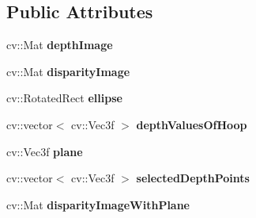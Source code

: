 \subsection*{Public Attributes}
\begin{DoxyCompactItemize}
\item 
\hypertarget{classHoopPosition_a0e936b9d6c792b73dbce44352be59756}{
cv::Mat {\bfseries depthImage}}
\label{classHoopPosition_a0e936b9d6c792b73dbce44352be59756}

\item 
\hypertarget{classHoopPosition_a667a7bce18b5eea72c46b50e4d5a9e5c}{
cv::Mat {\bfseries disparityImage}}
\label{classHoopPosition_a667a7bce18b5eea72c46b50e4d5a9e5c}

\item 
\hypertarget{classHoopPosition_ac1928a1d7ef1a80dd8f9325f7e1ad941}{
cv::RotatedRect {\bfseries ellipse}}
\label{classHoopPosition_ac1928a1d7ef1a80dd8f9325f7e1ad941}

\item 
\hypertarget{classHoopPosition_a5ab8e737eb6047f73d391483c68a076c}{
cv::vector$<$ cv::Vec3f $>$ {\bfseries depthValuesOfHoop}}
\label{classHoopPosition_a5ab8e737eb6047f73d391483c68a076c}

\item 
\hypertarget{classHoopPosition_adad7cb5d3961670620eebe4d190bf062}{
cv::Vec3f {\bfseries plane}}
\label{classHoopPosition_adad7cb5d3961670620eebe4d190bf062}

\item 
\hypertarget{classHoopPosition_aac3dd07ab3c719fcd1ac4630907a7d03}{
cv::vector$<$ cv::Vec3f $>$ {\bfseries selectedDepthPoints}}
\label{classHoopPosition_aac3dd07ab3c719fcd1ac4630907a7d03}

\item 
\hypertarget{classHoopPosition_a9f4fde272e414b0afb69a142956117e1}{
cv::Mat {\bfseries disparityImageWithPlane}}
\label{classHoopPosition_a9f4fde272e414b0afb69a142956117e1}

\end{DoxyCompactItemize}



